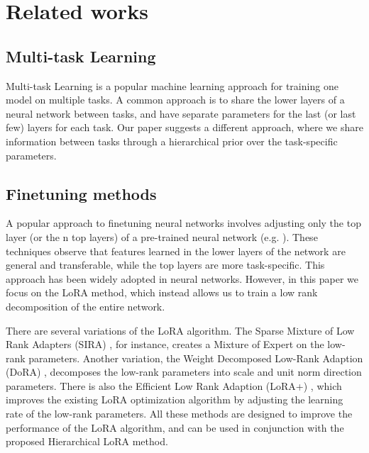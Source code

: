\documentclass[fullpaper]{nldl}
\begin{document}


\section{Related works} \label{sec:related_works}

\subsection{Multi-task Learning}
Multi-task Learning \cite{caruana_multitask_1997} is a popular machine learning approach for training one model on multiple tasks. A common approach is to share the lower layers of a neural network between tasks, and have separate parameters for the last (or last few) layers for each task. Our paper suggests a different approach, where we share information between tasks through a hierarchical prior over the task-specific parameters.

\subsection{Finetuning methods}
A popular approach to finetuning neural networks involves adjusting only the top layer (or the n top layers) of a pre-trained neural network (e.g. \cite{yosinski_how_2014}). These techniques observe that features learned in the lower layers of the network are general and transferable, while the top layers are more task-specific. This approach has been widely adopted in neural networks. However, in this paper we focus on the LoRA method, which instead allows us to train a low rank decomposition of the entire network.

There are several variations of the LoRA algorithm. The Sparse Mixture of Low Rank Adapters (SIRA) \cite{zhu_sira_2023}, for instance, creates a Mixture of Expert on the low-rank parameters. Another variation, the Weight Decomposed Low-Rank Adaption (DoRA) \cite{hayou_lora_2024}, decomposes the low-rank parameters into scale and unit norm direction parameters. There is also the Efficient Low Rank Adaption (LoRA+) \cite{hayou_lora_2024}, which improves the existing LoRA optimization algorithm by adjusting the learning rate of the low-rank parameters.
All these methods are designed to improve the performance of the LoRA algorithm, and can be used in conjunction with the proposed Hierarchical LoRA method.
\end{document}
